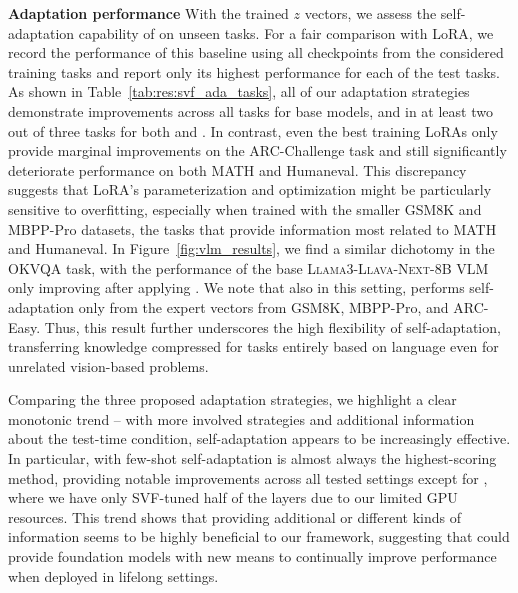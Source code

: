 \textbf{Adaptation performance}
With the \svdacro trained $z$ vectors, we assess the self-adaptation capability of \implname on unseen tasks.
For a fair comparison with LoRA, we record the performance of this baseline using all checkpoints from the considered training tasks and report only its highest performance for each of the test tasks. 
As shown in Table~\ref{tab:res:svf_ada_tasks}, all of our \implname adaptation strategies demonstrate improvements across all tasks for \llama base models, and in at least two out of three tasks for both \mistral and \llamaXL.
In contrast, even the best training LoRAs only provide marginal improvements on the ARC-Challenge task and still significantly deteriorate performance on both MATH and Humaneval. 
This discrepancy suggests that LoRA's parameterization and optimization might be particularly sensitive to overfitting, especially when trained with the smaller GSM8K and MBPP-Pro datasets, the tasks that provide information most related to MATH and Humaneval.
In Figure~\ref{fig:vlm_results}, we find a similar dichotomy in the OKVQA task, with the performance of the base \textsc{Llama3-Llava-Next-8B} VLM only improving after applying \implname.
We note that also in this setting, \implname performs self-adaptation only from the expert vectors from GSM8K, MBPP-Pro, and ARC-Easy.
Thus, this result further underscores the high flexibility of self-adaptation, transferring knowledge compressed for tasks entirely based on language even for unrelated vision-based problems.



Comparing the three proposed adaptation strategies, we highlight a clear monotonic trend -- with more involved strategies and additional information about the test-time condition, self-adaptation appears to be increasingly effective.
In particular, \implname with few-shot self-adaptation is almost always the highest-scoring method, providing notable improvements across all tested settings except for \llamaXL@MATH, where we have only SVF-tuned half of the layers due to our limited GPU resources.
This trend shows that providing additional or different kinds of information seems to be highly beneficial to our framework, suggesting that \implname could provide foundation models with new means to continually improve performance when deployed in lifelong settings.



